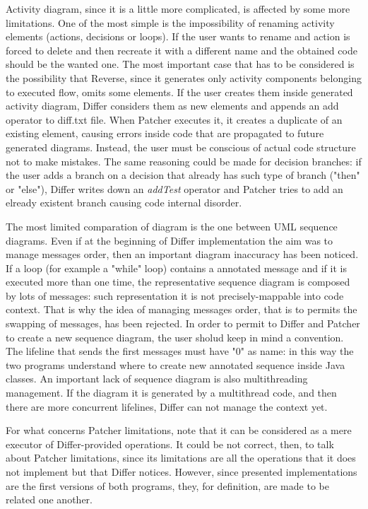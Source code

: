 Activity diagram, since it is a little more complicated, is affected by some more limitations.
One of the most simple is the impossibility of renaming activity elements (actions, decisions or loops). If the user wants to rename and action is forced to delete and then recreate it with a different name and the obtained code should be the wanted one.
The most important case that has to be considered is the possibility that Reverse, since it generates only activity components belonging to executed flow, omits some elements.
If the user creates them inside generated activity diagram, Differ considers them as new elements and appends an add operator to diff.txt file. When Patcher executes it, it creates a duplicate of an existing element, causing errors inside code that are propagated to future generated diagrams. Instead, the user must be conscious of actual code structure not to make mistakes.
The same reasoning could be made for decision branches: if the user adds a branch on a decision that already has such type of branch ("then" or "else"), Differ writes down an \textit{addTest} operator and Patcher tries to add an elready existent branch causing code internal disorder.

The most limited comparation of diagram is the one between UML sequence diagrams. Even if at the beginning of Differ implementation the aim was to manage messages order, then an important diagram inaccuracy has been noticed.
If a loop (for example a "while" loop) contains a annotated message and if it is executed more than one time, the representative sequence diagram is composed by lots of messages: such representation it is not precisely-mappable into code context. That is why the idea of managing messages order, that is to permits the swapping of messages, has been rejected.
In order to permit to Differ and Patcher to create a new sequence diagram, the user sholud keep in mind a convention. The lifeline that sends the first messages must have "0" as name: in this way the two programs understand where to create new annotated sequence inside Java classes.
An important lack of sequence diagram is also multithreading management. If the diagram it is generated by a multithread code, and then there are more concurrent lifelines, Differ can not manage the context yet.

For what concerns Patcher limitations, note that it can be considered as a mere executor of Differ-provided operations. It could be not correct, then, to talk about Patcher limitations, since its limitations are all the operations that it does not implement but that Differ notices. However, since presented implementations are the first versions of both programs, they, for definition, are made to be related one another.

